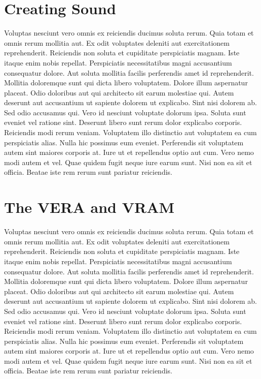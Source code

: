 \documentclass[
	11pt, %
	fleqn, %
	letterpaper, %
]{CommodoreBlueBook}
\begin{document}
\chapter*{Creating Sound}

Voluptas nesciunt vero omnis ex reiciendis ducimus soluta rerum. Quia totam et
omnis rerum mollitia aut. Ex odit voluptates deleniti aut exercitationem
reprehenderit. Reiciendis non soluta et cupiditate perspiciatis magnam. Iste
itaque enim nobis repellat. Perspiciatis necessitatibus magni accusantium
consequatur dolore. Aut soluta mollitia facilis perferendis amet id
reprehenderit. Mollitia doloremque sunt qui dicta libero voluptatem. Dolore
illum aspernatur placeat. Odio doloribus aut qui architecto sit earum molestiae
qui. Autem deserunt aut accusantium ut sapiente dolorem ut explicabo. Sint nisi
dolorem ab. Sed odio accusamus qui. Vero id nesciunt voluptate dolorum ipsa.
Soluta sunt eveniet vel ratione sint. Deserunt libero sunt rerum dolor
explicabo corporis. Reiciendis modi rerum veniam. Voluptatem illo distinctio
aut voluptatem ea cum perspiciatis alias. Nulla hic possimus eum eveniet.
Perferendis sit voluptatem autem sint maiores corporis at. Iure ut et
repellendus optio aut cum. Vero nemo modi autem et vel. Quae quidem fugit neque
iure earum sunt. Nisi non ea sit et officia. Beatae iste rem rerum sunt
pariatur reiciendis.

\chapter*{The VERA and VRAM}

Voluptas nesciunt vero omnis ex reiciendis ducimus soluta rerum. Quia totam et
omnis rerum mollitia aut. Ex odit voluptates deleniti aut exercitationem
reprehenderit. Reiciendis non soluta et cupiditate perspiciatis magnam. Iste
itaque enim nobis repellat. Perspiciatis necessitatibus magni accusantium
consequatur dolore. Aut soluta mollitia facilis perferendis amet id
reprehenderit. Mollitia doloremque sunt qui dicta libero voluptatem. Dolore
illum aspernatur placeat. Odio doloribus aut qui architecto sit earum molestiae
qui. Autem deserunt aut accusantium ut sapiente dolorem ut explicabo. Sint nisi
dolorem ab. Sed odio accusamus qui. Vero id nesciunt voluptate dolorum ipsa.
Soluta sunt eveniet vel ratione sint. Deserunt libero sunt rerum dolor
explicabo corporis. Reiciendis modi rerum veniam. Voluptatem illo distinctio
aut voluptatem ea cum perspiciatis alias. Nulla hic possimus eum eveniet.
Perferendis sit voluptatem autem sint maiores corporis at. Iure ut et
repellendus optio aut cum. Vero nemo modi autem et vel. Quae quidem fugit neque
iure earum sunt. Nisi non ea sit et officia. Beatae iste rem rerum sunt
pariatur reiciendis.
\end{document}
